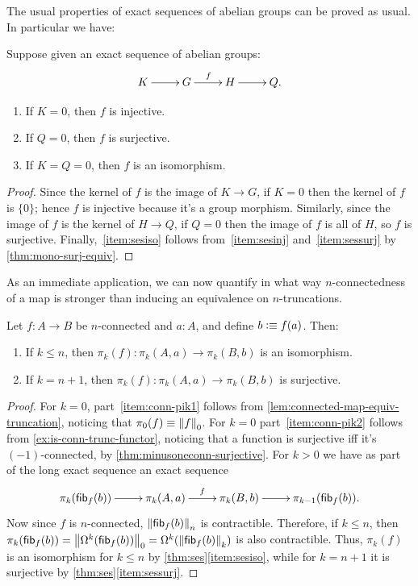 The usual properties of exact sequences of abelian groups can be proved as
usual. In particular we have:
\begin{lem}\label{thm:ses}
  Suppose given an exact sequence of abelian groups:
  \[\xymatrix{K \ar[r]& G \ar^f[r] & H \ar[r] & Q.}\]
  \begin{enumerate}
  \item If $K=0$, then $f$ is injective.\label{item:sesinj}
  \item If $Q=0$, then $f$ is surjective.\label{item:sessurj}
  \item If $K=Q=0$, then $f$ is an isomorphism.\label{item:sesiso}
  \end{enumerate}
\end{lem}
\begin{proof}
  Since the kernel of $f$ is the image of $K\to G$, if $K=0$ then the kernel of $f$ is $\{0\}$;
  hence $f$ is injective because it's a group morphism.
  Similarly, since the image of $f$ is the kernel of $H\to Q$, if $Q=0$ then the image of $f$ is all of $H$, so $f$ is surjective.
  Finally,~\ref{item:sesiso} follows from~\ref{item:sesinj} and~\ref{item:sessurj} by \cref{thm:mono-surj-equiv}.
\end{proof}

As an immediate application, we can now quantify in what way $n$-connectedness of a map is stronger than inducing an equivalence on $n$-truncations.

\begin{cor}\label{thm:conn-pik}
  Let $f:A\to B$ be $n$-connected and $a:A$, and define $b\defeq f(a)$.  Then:
  \begin{enumerate}
  \item If $k\le n$, then $\pi_k(f):\pi_k(A,a) \to \pi_k(B,b)$ is an isomorphism.\label{item:conn-pik1}
  \item If $k=n+1$, then $\pi_k(f):\pi_k(A,a) \to \pi_k(B,b)$ is surjective.\label{item:conn-pik2}
  \end{enumerate}
\end{cor}
\begin{proof}
  For $k=0$, part~\ref{item:conn-pik1} follows from \cref{lem:connected-map-equiv-truncation}, noticing that $\pi_0(f)\equiv\trunc 0f$.
  For $k=0$ part~\ref{item:conn-pik2} follows from \cref{ex:is-conn-trunc-functor}, noticing that a function is surjective iff it's $(-1)$-connected, by \cref{thm:minusoneconn-surjective}.
  For $k>0$ we have as part of the long exact sequence an exact sequence
  \[\xymatrix{\pi_k(\hfib f b) \ar[r]& \pi_k(A,a) \ar^f[r] & \pi_k(B,b) \ar[r] & \pi_{k-1}(\hfib f b).}\]
  Now since $f$ is $n$-connected, $\trunc n{\hfib f b}$ is contractible.
  Therefore, if $k\le n$, then $\pi_k(\hfib f b) = \trunc0{\Omega^k(\hfib f b)} = \Omega^k(\trunc k{\hfib f b})$ is also contractible.
  Thus, $\pi_k(f)$ is an isomorphism for $k\le n$ by \cref{thm:ses}\ref{item:sesiso}, while for $k=n+1$ it is surjective by \cref{thm:ses}\ref{item:sessurj}.
\end{proof}

